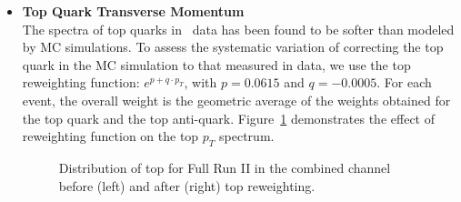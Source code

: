 \begin{itemize}
    \item {\bf Top Quark Transverse Momentum} \\
    The \pT spectra of top quarks in \ttbar\ data has been found to be softer than modeled by MC simulations.
    To assess the systematic variation of correcting the top quark \pT in the MC simulation to that measured in data, we use the \beamenergy top \pT reweighting function: $e^{p+q \cdot p_T}$, with $p = 0.0615$ and $q = -0.0005$.
    For each event, the overall weight is the geometric average of the weights obtained for the top quark and the top anti-quark.
    Figure~\ref{fig:fullRun2ULtopptreweighting} demonstrates the effect of reweighting function on the top $p_T$ spectrum.
    \begin{figure}
      \begin{center}
      \end{center}
      \caption{\small Distribution of top \pT for Full Run II in the combined channel before (left) and after (right) top \pT reweighting.}      
      \label{fig:fullRun2ULtopptreweighting}
    \end{figure}
\end{itemize}
















